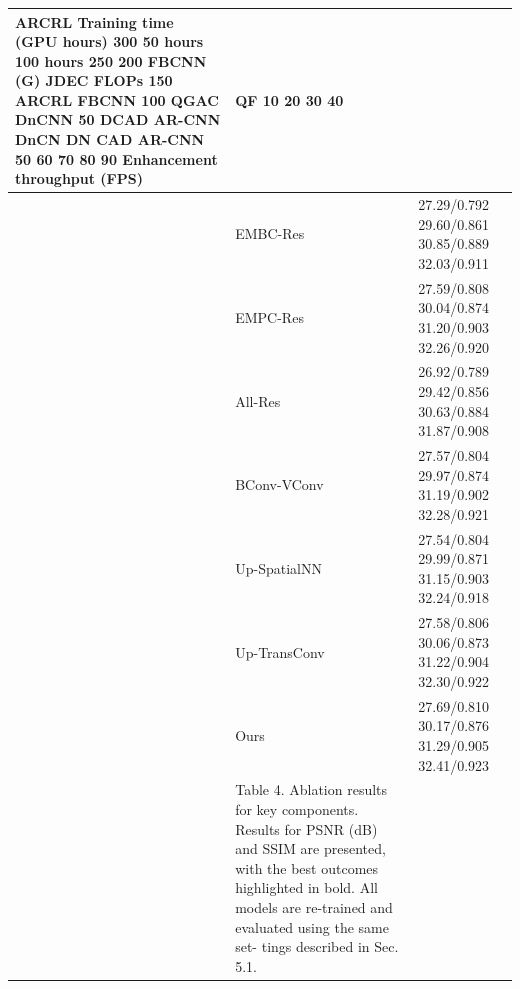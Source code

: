 \begin{tabular}{lll}
\toprule
ARCRL Training time (GPU hours) 300 50 hours 100 hours 250 200 FBCNN (G) JDEC FLOPs 150 ARCRL FBCNN 100 QGAC DnCNN 50 DCAD AR-CNN DnCN DN CAD AR-CNN 50 60 70 80 90 Enhancement throughput (FPS) & QF 10 20 30 40 &  \\
\midrule
 & EMBC-Res & 27.29/0.792 29.60/0.861 30.85/0.889 32.03/0.911 \\
 & EMPC-Res & 27.59/0.808 30.04/0.874 31.20/0.903 32.26/0.920 \\
 & All-Res & 26.92/0.789 29.42/0.856 30.63/0.884 31.87/0.908 \\
 & BConv-VConv & 27.57/0.804 29.97/0.874 31.19/0.902 32.28/0.921 \\
 & Up-SpatialNN & 27.54/0.804 29.99/0.871 31.15/0.903 32.24/0.918 \\
 & Up-TransConv & 27.58/0.806 30.06/0.873 31.22/0.904 32.30/0.922 \\
 & Ours & 27.69/0.810 30.17/0.876 31.29/0.905 32.41/0.923 \\
 & Table 4. Ablation results for key components. Results for PSNR (dB) and SSIM are presented, with the best outcomes highlighted in bold. All models are re-trained and evaluated using the same set- tings described in Sec. 5.1. &  \\
\bottomrule
\end{tabular}
